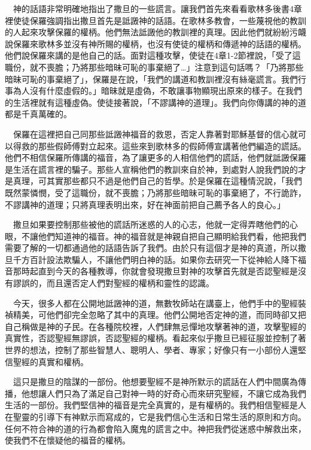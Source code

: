 \documentclass{book}
\begin{document}
　神的話語非常明確地指出了撒旦的一些謊言。讓我們首先來看看歌林多後書4章裡使徒保羅強調指出撒旦首先是詆譭神的話語。在歌林多教會，一些蔑視他的教訓的人起來攻擊保羅的權柄。他們無法詆譭他的教訓裡的真理。因此他們就紛紛污衊說保羅來歌林多並沒有神所賜的權柄，也沒有使徒的權柄和傳遞神的話語的權柄。他們說保羅來講的是他自己的話。面對這種攻擊，使徒在4章1-2節裡說，「受了這職份，就不喪膽；乃將那些暗昧可恥的事棄絕了…」注意到這句話嗎？「乃將那些暗昧可恥的事棄絕了」，保羅是在說，「我們的講道和教訓裡沒有絲毫謊言。我們行事為人沒有什麼虛假的。」暗昧就是虛偽，不敢讓事物顯現出原來的樣子。在我們的生活裡就有這種虛偽。使徒接著說，「不謬講神的道理」。我們向你傳講的神的道都是千真萬確的。

　保羅在這裡把自己同那些詆譭神福音的救恩，否定人靠著對耶穌基督的信心就可以得救的那些假師傅對立起來。這些來到歌林多的假師傅宣講著他們編造的謊話。他們不相信保羅所傳講的福音，為了讓更多的人相信他們的謊話，他們就詆譭保羅是生活在謊言裡的騙子。那些人宣稱他們的教訓來自於神，到處對人說我們說的才是真理，可其實那些都只不過是他們自己的哲學。於是保羅在這種情況說，「我們既然蒙憐憫，受了這職份，就不喪膽；乃將那些暗昧可恥的事棄絕了，不行詭詐，不謬講神的道理；只將真理表明出來，好在神面前把自己薦予各人的良心。」

　撒旦如果要控制那些被他的謊話所迷惑的人的心志，他就一定得弄瞎他們的心眼，不讓他們知道神的福音。神的福音就是神親自把自己顯明給我們看，他把我們需要了解的一切都通過他的話語告訴了我們。由於只有這個才是神的真道，所以撒旦千方百計設法欺騙人，不讓他們明白神的話。如果你去研究一下從神給人降下福音那時起直到今天的各種教導，你就會發現撒旦對神的攻擊首先就是否認聖經是沒有謬誤的，而且還否定人們對聖經的權柄和靈性的認識。

　今天，很多人都在公開地詆譭神的道，無數牧師站在講臺上，他們手中的聖經裝禎精美，可他們卻完全忽略了其中的真理。他們公開地否定神的道，而同時卻又把自己稱做是神的子民。在各種院校裡，人們肆無忌憚地攻擊著神的道，攻擊聖經的真實性，否認聖經無謬誤，否認聖經的權柄。看起來似乎撒旦已經征服並控制了著世界的想法，控制了那些智慧人、聰明人、學者、專家；好像只有一小部份人還堅信聖經的真實和權柄。

　這只是撒旦的陰謀的一部份。他想要聖經不是神所默示的謊話在人們中間廣為傳播，他想讓人們只為了滿足自己對神一時的好奇心而來研究聖經，不讓它成為我們生活的一部份。我們堅信神的福音是完全真實的，是有權柄的。我們相信聖經是人在聖靈的引導下有神默示而寫成的，它是我們信心生活和日常生活的原則和方向。任何不符合神的道的行為都會陷入魔鬼的謊言之中。神把我們從迷惑中解救出來，使我們不在懷疑他的福音的權柄。
\end{document}
